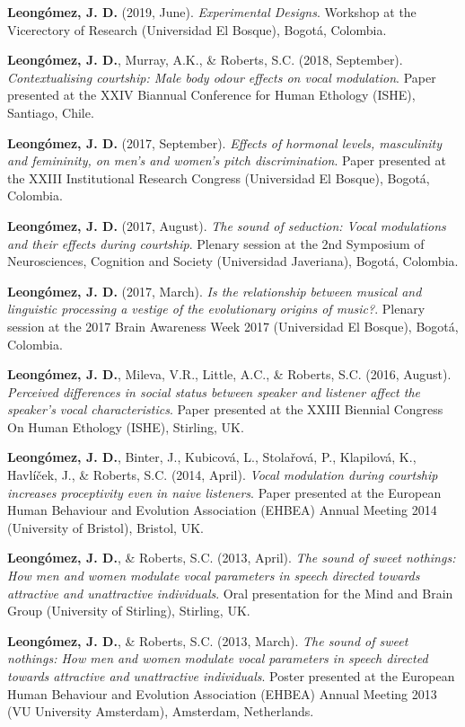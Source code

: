\documentclass[11pt,a4paper,]{awesome-cv}
\begin{document}
\textbf{Leongómez, J. D.} (2019, June). \emph{Experimental Designs}.
Workshop at the Vicerectory of Research (Universidad El Bosque), Bogotá,
Colombia.

\textbf{Leongómez, J. D.}, Murray, A.K., \& Roberts, S.C. (2018,
September). \emph{Contextualising courtship: Male body odour effects on
vocal modulation}. Paper presented at the XXIV Biannual Conference for
Human Ethology (ISHE), Santiago, Chile.

\textbf{Leongómez, J. D.} (2017, September). \emph{Effects of hormonal
levels, masculinity and femininity, on men's and women's pitch
discrimination}. Paper presented at the XXIII Institutional Research
Congress (Universidad El Bosque), Bogotá, Colombia.

\textbf{Leongómez, J. D.} (2017, August). \emph{The sound of seduction:
Vocal modulations and their effects during courtship}. Plenary session
at the 2nd Symposium of Neurosciences, Cognition and Society
(Universidad Javeriana), Bogotá, Colombia.

\textbf{Leongómez, J. D.} (2017, March). \emph{Is the relationship
between musical and linguistic processing a vestige of the evolutionary
origins of music?}. Plenary session at the 2017 Brain Awareness Week
2017 (Universidad El Bosque), Bogotá, Colombia.

\textbf{Leongómez, J. D.}, Mileva, V.R., Little, A.C., \& Roberts, S.C.
(2016, August). \emph{Perceived differences in social status between
speaker and listener affect the speaker's vocal characteristics}. Paper
presented at the XXIII Biennial Congress On Human Ethology (ISHE),
Stirling, UK.

\textbf{Leongómez, J. D.}, Binter, J., Kubicová, L., Stolařová, P.,
Klapilová, K., Havlíček, J., \& Roberts, S.C. (2014, April). \emph{Vocal
modulation during courtship increases proceptivity even in naive
listeners}. Paper presented at the European Human Behaviour and
Evolution Association (EHBEA) Annual Meeting 2014 (University of
Bristol), Bristol, UK.

\textbf{Leongómez, J. D.}, \& Roberts, S.C. (2013, April). \emph{The
sound of sweet nothings: How men and women modulate vocal parameters in
speech directed towards attractive and unattractive individuals}. Oral
presentation for the Mind and Brain Group (University of Stirling),
Stirling, UK.

\textbf{Leongómez, J. D.}, \& Roberts, S.C. (2013, March). \emph{The
sound of sweet nothings: How men and women modulate vocal parameters in
speech directed towards attractive and unattractive individuals}. Poster
presented at the European Human Behaviour and Evolution Association
(EHBEA) Annual Meeting 2013 (VU University Amsterdam), Amsterdam,
Netherlands.
\end{document}
